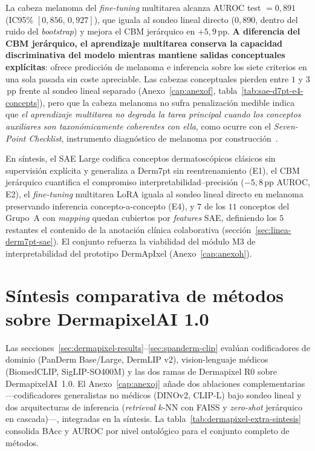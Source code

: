 La cabeza melanoma del \emph{fine-tuning} multitarea alcanza AUROC test
$= 0{,}891$ (IC95\% $[0{,}856,\,0{,}927]$), que iguala al sondeo lineal
directo ($0{,}890$, dentro del ruido del \emph{bootstrap}) y mejora el
CBM jerárquico en $+5{,}9$\,pp. \textbf{A diferencia del CBM jerárquico,
el aprendizaje multitarea conserva la capacidad discriminativa del
modelo mientras mantiene salidas conceptuales explícitas}: ofrece
predicción de melanoma e inferencia sobre los siete criterios en una
sola pasada sin coste apreciable. Las cabezas conceptuales pierden entre
$1$ y $3$\,pp frente al sondeo lineal separado (Anexo~\ref{cap:anexof},
tabla~\ref{tab:sae-d7pt-e4-concepts}), pero que la cabeza melanoma no
sufra penalización medible indica que \emph{el aprendizaje multitarea no
degrada la tarea principal cuando los conceptos auxiliares son
taxonómicamente coherentes con ella}, como ocurre con el \emph{Seven-Point
Checklist}, instrumento diagnóstico de melanoma por
construcción~\cite{kawahara2019}.

En síntesis, el SAE Large codifica conceptos dermatoscópicos clásicos
sin supervisión explícita y generaliza a Derm7pt sin reentrenamiento
(E1), el CBM jerárquico cuantifica el compromiso
interpretabilidad--precisión ($-5{,}8$\,pp AUROC, E2), el
\emph{fine-tuning} multitarea LoRA iguala al sondeo lineal directo en
melanoma preservando inferencia concepto-a-concepto (E4), y $7$ de los
$11$ conceptos del Grupo~A con \emph{mapping} quedan cubiertos por
\emph{features} SAE, definiendo los $5$ restantes el contenido de la
anotación clínica colaborativa (sección~\ref{sec:linea-derm7pt-sae}).
El conjunto refuerza la viabilidad del módulo M3 de interpretabilidad
del prototipo DermApIxel (Anexo~\ref{cap:anexoh}).

\section{Síntesis comparativa de métodos sobre DermapixelAI 1.0}
\label{sec:dermapixel-extra}
\label{sec:dermapixel-extra-sintesis}

Las secciones~\ref{sec:dermapixel-results}--\ref{sec:spanderm-clip}
evalúan codificadores de dominio (PanDerm Base/Large, DermLIP v2),
vision-lenguaje médicos (BiomedCLIP, SigLIP-SO400M) y las dos ramas de
Dermapixel R0 sobre DermapixelAI~1.0. El Anexo~\ref{cap:anexoj} añade
dos ablaciones complementarias ---codificadores generalistas no
médicos (DINOv2, CLIP-L) bajo sondeo lineal y dos arquitecturas de
inferencia (\emph{retrieval} $k$-NN con FAISS y \emph{zero-shot}
jerárquico en cascada)---, integradas en la síntesis. La
tabla~\ref{tab:dermapixel-extra-sintesis} consolida BAcc y AUROC por
nivel ontológico para el conjunto completo de métodos.

